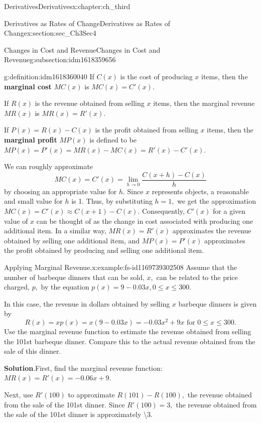 \documentclass[oneside,10pt,]{book}
\newcommand{\blocktitlefont}{\relax}
\newcommand{\terminology}[1]{\textbf{#1}}
\numberwithin{equation}{section}
\begin{document}
\begin{chapterptx}{Derivatives}{}{Derivatives}{}{}{x:chapter:ch_third}
\begin{sectionptx}{Derivatives as Rates of Change}{}{Derivatives as Rates of Change}{}{}{x:section:sec_Ch3Sec4}
\begin{subsectionptx}{Changes in Cost and Revenue}{}{Changes in Cost and Revenue}{}{}{g:subsection:idm1618359656}
\begin{definition}{}{g:definition:idm1618360040}%
If \(C(x)\) is the cost of producing \(x\) items, then the \terminology{marginal cost} \(MC(x)\) is \(MC(x)=C'(x).\)%
\par
If \(R(x)\) is the revenue obtained from selling \(x\) items, then the marginal revenue \(MR(x)\) is \(MR(x)=R'(x).\)%
\par
If \(P(x)=R(x)-C(x)\) is the profit obtained from selling \(x\) items, then the \terminology{marginal profit} \(MP(x)\) is defined to be \(MP(x)=P'(x)=MR(x)-MC(x)=R'(x)-C'(x).\)%
\end{definition}
We can roughly approximate%
%
\begin{equation*}
MC(x)=C'(x)=\lim_{h\to 0}\frac{C(x+h)-C(x)}{h}
\end{equation*}
by choosing an appropriate value for \(h.\) Since \(x\) represents objects, a reasonable and small value for \(h\) is 1. Thus, by substituting \(h=1,\) we get the approximation \(MC(x)=C'(x)\approx C(x+1)-C(x).\) Consequently, \(C'(x)\) for a given value of \(x\) can be thought of as the change in cost associated with producing one additional item. In a similar way, \(MR(x)=R'(x)\) approximates the revenue obtained by selling one additional item, and \(MP(x)=P'(x)\) approximates the profit obtained by producing and selling one additional item.%
\begin{example}{Applying Marginal Revenue.}{x:example:fs-id1169739302508}%
Assume that the number of barbeque dinners that can be sold, \(x,\) can be related to the price charged, \(p,\) by the equation \(p(x)=9-0.03x,0\leq  x\leq  300.\)%
\par
In this case, the revenue in dollars obtained by selling \(x\) barbeque dinners is given by%
%
\begin{equation*}
R(x)=xp(x)=x(9-0.03x)=-0.03x^2+9x \text{ for } 0\leq  x\leq  300.
\end{equation*}
Use the marginal revenue function to estimate the revenue obtained from selling the 101st barbeque dinner. Compare this to the actual revenue obtained from the sale of this dinner.%
\par\smallskip%
\noindent\textbf{\blocktitlefont Solution}.\hypertarget{g:solution:idm1618344296}{}\quad{}First, find the marginal revenue function: \(MR(x)=R'(x)=-0.06x+9.\)%
\par
Next, use \(R'(100)\) to approximate \(R(101)-R(100),\) the revenue obtained from the sale of the 101st dinner. Since \(R'(100)=3,\) the revenue obtained from the sale of the 101st dinner is approximately \textbackslash{}\textdollar{}3.%

\end{example}
\end{subsectionptx}
\end{sectionptx}
\end{chapterptx}
\end{document}
